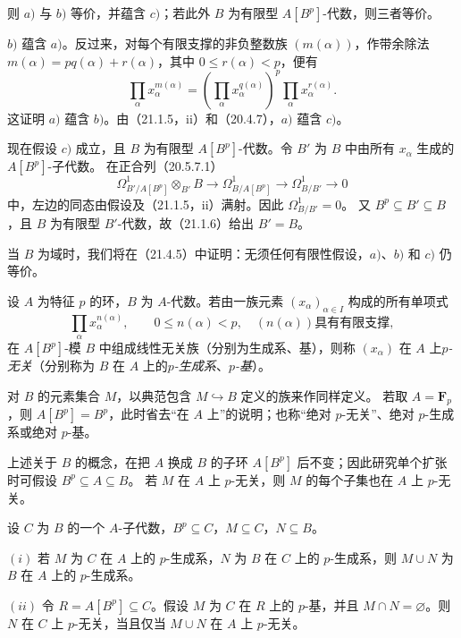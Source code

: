 则 $a)$ 与 $b)$ 等价，并蕴含 $c)$；若此外 $B$ 为有限型 $A[B^p]$-代数，则三者等价。

\eproof
$b)$ 蕴含 $a)$。反过来，对每个有限支撑的非负整数族 $(m(\alpha))$，作带余除法
$m(\alpha)=pq(\alpha)+r(\alpha)$，其中 $0\le r(\alpha)<p$，便有
\[
 \prod_\alpha x_\alpha^{m(\alpha)}
 =\left(\prod_\alpha x_\alpha^{q(\alpha)}\right)^p
   \prod_\alpha x_\alpha^{r(\alpha)}.
\]
这证明 $a)$ 蕴含 $b)$。由（21.1.5，ii）和（20.4.7），$a)$ 蕴含 $c)$。

现在假设 $c)$ 成立，且 $B$ 为有限型 $A[B^p]$-代数。令 $B'$ 为 $B$ 中由所有 $x_\alpha$ 生成的 $A[B^p]$-子代数。
在正合列（20.5.7.1）
\[
 \Omega^1_{B'/A[B^p]}\otimes_{B'} B
 \longrightarrow\Omega^1_{B/A[B^p]}
 \longrightarrow\Omega^1_{B/B'}\longrightarrow0
\]
中，左边的同态由假设及（21.1.5，ii）满射。因此 $\Omega^1_{B/B'}=0$。
又 $B^p\subseteq B'\subseteq B$，且 $B$ 为有限型 $B'$-代数，故（21.1.6）给出 $B'=B$。
\finishproof

当 $B$ 为域时，我们将在（21.4.5）中证明：无须任何有限性假设，$a)$、$b)$ 和 $c)$ 仍等价。

设 $A$ 为特征 $p$ 的环，$B$ 为 $A$-代数。若由一族元素 $(x_\alpha)_{\alpha\in I}$ 构成的所有单项式
\[
 \prod_\alpha x_\alpha^{n(\alpha)},\qquad
 0\le n(\alpha)<p,\quad (n(\alpha))\text{具有有限支撑},
\]
在 $A[B^p]$-模 $B$ 中组成线性无关族（分别为生成系、基），则称 $(x_\alpha)$ 在 $A$ 上\emph{$p$-无关}（分别称为 $B$ 在 $A$ 上的\emph{$p$-生成系}、\emph{$p$-基}）。

对 $B$ 的元素集合 $M$，以典范包含 $M\hookrightarrow B$ 定义的族来作同样定义。
若取 $A=\mathbf F_p$，则 $A[B^p]=B^p$，此时省去“在 $A$ 上”的说明；也称“绝对 $p$-无关”、绝对 $p$-生成系或绝对 $p$-基。

上述关于 $B$ 的概念，在把 $A$ 换成 $B$ 的子环 $A[B^p]$ 后不变；因此研究单个扩张时可假设 $B^p\subseteq A\subseteq B$。
若 $M$ 在 $A$ 上 $p$-无关，则 $M$ 的每个子集也在 $A$ 上 $p$-无关。

设 $C$ 为 $B$ 的一个 $A$-子代数，$B^p\subseteq C$，$M\subseteq C$，$N\subseteq B$。

$(i)$ 若 $M$ 为 $C$ 在 $A$ 上的 $p$-生成系，$N$ 为 $B$ 在 $C$ 上的 $p$-生成系，则 $M\cup N$ 为 $B$ 在 $A$ 上的 $p$-生成系。

$(ii)$ 令 $R=A[B^p]\subseteq C$。假设 $M$ 为 $C$ 在 $R$ 上的 $p$-基，并且 $M\cap N=\varnothing$。则 $N$ 在 $C$ 上 $p$-无关，当且仅当 $M\cup N$ 在 $A$ 上 $p$-无关。

